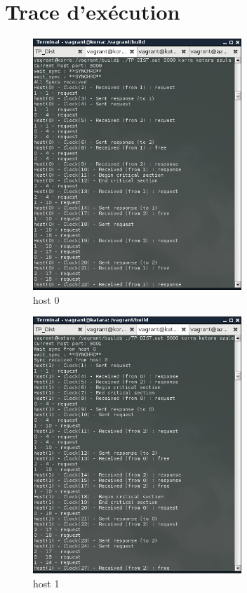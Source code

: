 \section{Trace d'exécution}

\begin{figure}[h!]
    \centering
    \includegraphics[width=0.7\textwidth]{screenshots/h0_korra.png}
    \caption{host 0}
\end{figure}%

\begin{figure}[h!]
    \centering
    \includegraphics[width=0.7\textwidth]{screenshots/h1_katara.png}
    \caption{host 1}
\end{figure}

